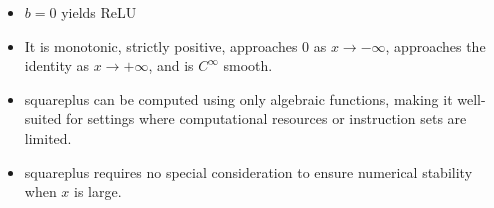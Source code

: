\begin{itemize}
    \item $b=0$ yields ReLU
    \item It is monotonic, strictly positive, approaches 0 as \({\displaystyle x\to -\infty }\), approaches the identity as \({\displaystyle x\to +\infty }\), and is \({\displaystyle C^{\infty }}\) smooth.
    \item squareplus can be computed using only algebraic functions, making it well-suited for settings where computational resources or instruction sets are limited.
    \item squareplus requires no special consideration to ensure numerical stability when \({\displaystyle x}\) is large.
\end{itemize}























































